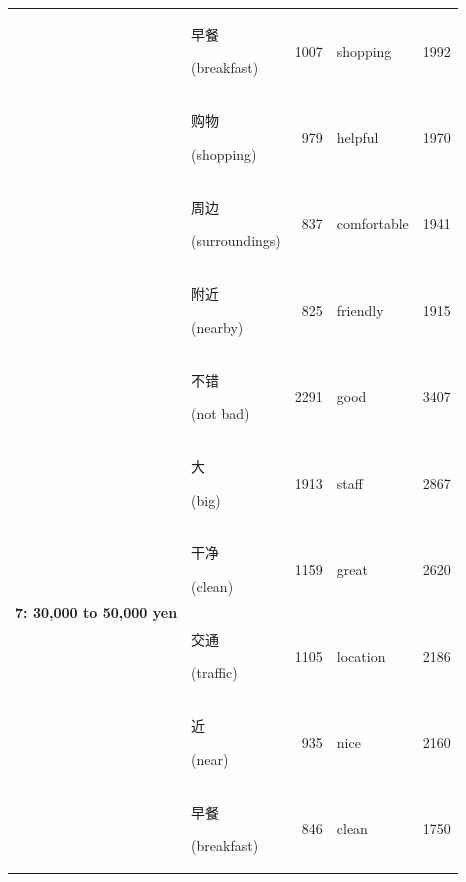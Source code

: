 \documentclass[smallextended,natbib]{svjour3}       %
\begin{document}
\begin{table}[ht]
{\begin{tabular}{|c|lr|lr|}
                                                             & \begin{CJK}{UTF8}{gbsn}早餐\end{CJK} (breakfast)       & 1007  & shopping    & 1992  \\  
                                                             & \begin{CJK}{UTF8}{gbsn}购物\end{CJK} (shopping)        & 979   & helpful     & 1970  \\  
                                                             & \begin{CJK}{UTF8}{gbsn}周边\end{CJK} (surroundings)    & 837   & comfortable & 1941  \\  
                                                             & \begin{CJK}{UTF8}{gbsn}附近\end{CJK} (nearby)          & 825   & friendly    & 1915  \\ \hline
        \multirow{10}{*}{\textbf{7: 30,000 to 50,000 yen}}   & \begin{CJK}{UTF8}{gbsn}不错\end{CJK} (not bad)         & 2291  & good        & 3407  \\  
                                                             & \begin{CJK}{UTF8}{gbsn}大\end{CJK} (big)              & 1913  & staff       & 2867  \\  
                                                             & \begin{CJK}{UTF8}{gbsn}干净\end{CJK} (clean)           & 1159  & great       & 2620  \\  
                                                             & \begin{CJK}{UTF8}{gbsn}交通\end{CJK} (traffic)         & 1105  & location    & 2186  \\  
                                                             & \begin{CJK}{UTF8}{gbsn}近\end{CJK} (near)             & 935   & nice        & 2160  \\  
                                                             & \begin{CJK}{UTF8}{gbsn}早餐\end{CJK} (breakfast)       & 846   & clean       & 1750  \\  

\end{tabular}}
\end{table}
\end{document}
